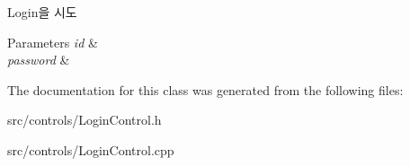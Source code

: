Login을 시도 
\begin{DoxyParams}{Parameters}
{\em id} & \\
\hline
{\em password} & \\
\hline
\end{DoxyParams}


The documentation for this class was generated from the following files\+:\begin{DoxyCompactItemize}
\item 
src/controls/Login\+Control.\+h\item 
src/controls/Login\+Control.\+cpp\end{DoxyCompactItemize}
